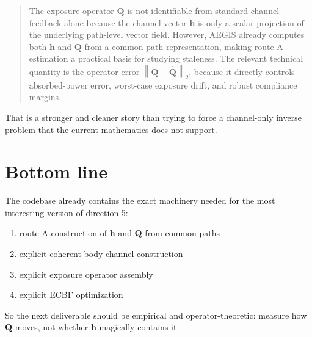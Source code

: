\documentclass[11pt]{article}
\newcommand{\hh}{\mathbf{h}}
\newcommand{\QQ}{\mathbf{Q}}
\newcommand{\norm}[1]{\left\lVert #1 \right\rVert}
\begin{document}
\begin{quote}
The exposure operator $\QQ$ is not identifiable from standard channel
feedback alone because the channel vector $\hh$ is only a scalar projection of
the underlying path-level vector field. However, AEGIS already computes both
$\hh$ and $\QQ$ from a common path representation, making route-A estimation a
practical basis for studying staleness. The relevant technical quantity is the
operator error $\norm{\QQ-\widehat{\QQ}}_2$, because it directly controls
absorbed-power error, worst-case exposure drift, and robust compliance
margins.
\end{quote}

That is a stronger and cleaner story than trying to force a channel-only
inverse problem that the current mathematics does not support.

\section*{Bottom line}

The codebase already contains the exact machinery needed for the most
interesting version of direction 5:
\begin{enumerate}
  \item route-A construction of $\hh$ and $\QQ$ from common paths
  \item explicit coherent body channel construction
  \item explicit exposure operator assembly
  \item explicit ECBF optimization
\end{enumerate}

So the next deliverable should be empirical and operator-theoretic:
measure how $\QQ$ moves, not whether $\hh$ magically contains it.
\end{document}
